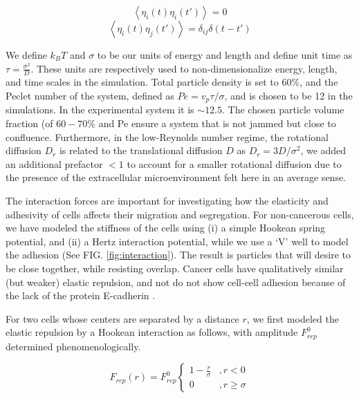 \documentclass[aps,prb,twocolumn,groupedaddress,nofootinbib,floatfix]{revtex4}
\begin{document}
\begin{equation}
\left\langle \eta_i(t)\eta_i(t')\right\rangle = 0 
\end{equation}
\begin{equation}
\left\langle \eta_i(t)\eta_j(t')\right\rangle = \delta_{ij} \delta(t-t')
\end{equation}


We define $k_BT$ and $\sigma$ to be our units of energy and length and define 
unit time as $\tau = \frac{\sigma^2}{D}$. These units are respectively used to non-dimensionalize 
energy, length, and time scales in the simulation. Total particle density is set to $60\%$, and 
the Peclet number of the system, defined as $Pe= v_p \tau/\sigma$, and is chosen to be 12 in the simulations.
In the experimental system it is  $\sim 12.5$. 
The chosen particle volume fraction (of $60-70 \%$ and Pe ensure a system that is not jammed but close to confluence.  Furthermore, 
in the low-Reynolds number regime, the rotational diffusion $D_r$ is related to the translational 
diffusion $D$ as $D_r= 3 D /\sigma^2$, we added an additional prefactor $<1$ to account for a smaller
rotational diffusion due to the presence of the extracellular microenvironment felt here in an average sense.




The interaction forces are important for investigating how the elasticity and adhesivity of cells affects their migration and segregation. For non-cancerous cells, 
we have modeled the stiffness of the cells using (i) a simple Hookean spring potential, and (ii) a Hertz interaction potential, while we use a `V' well to model the adhesion (See FIG. \ref{fig:interaction}). 
The result is particles that will desire to be close together, while resisting overlap. Cancer cells have qualitatively similar (but weaker) elastic repulsion, and not do not show 
cell-cell adhesion because of the lack of the protein E-cadherin \cite{Jeanes}. 


For two cells whose centers are separated by a distance $r$, we first modeled the elastic repulsion by a  Hookean interaction as follows, with amplitude $F^0_{rep}$ determined phenomenologically.
 
\begin{equation}
  F_{rep}(r) = F^0_{rep} \left\{ 
    \begin{array}{lr}
      1-\frac{r}{\sigma} &, r < 0\\
      0 &, r \ge \sigma
    \end{array}
  \right.
  \label{eq:frep}
\end{equation}
\end{document}
